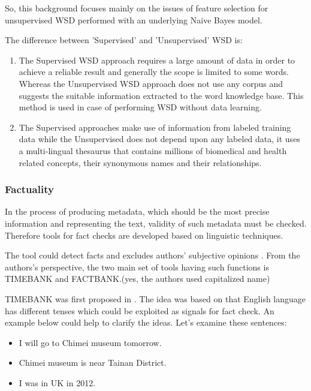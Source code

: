 So, this background focuses mainly on the issues of feature selection for unsupervised WSD performed with an underlying Naive Bayes model.

The difference between 'Supervised' and 'Unsupervised' WSD is:

\begin{enumerate}
	\item The Supervised WSD approach requires a large amount of data in order to achieve a reliable result and generally the scope is limited to some words. 
	Whereas the Unsupervised WSD approach does not use any corpus and suggests the suitable information extracted to the word knowledge base.
	This method is used in case of performing WSD without data learning.
	\item The Supervised approaches make use of information from labeled training data while the Unsupervised does not depend upon any labeled data, it uses a multi-lingual thesaurus that contains millions of biomedical and health related concepts, their synonymous names and their relationships.
\end{enumerate}


\subsubsection*{Factuality}

In the process of producing metadata, which should be the most precise information and representing the text, validity of such metadata must be checked. 
Therefore tools for fact checks are developed based on linguistic techniques. 

The tool could detect facts and excludes authors' subjective opinions \cite{Agerri2014}. 
From the authors's perspective, the two main set of tools having such functions is TIMEBANK and FACTBANK.(yes, the authors used capitalized name)

TIMEBANK was first proposed in \cite{pustejovsky2003timebank}. 
The idea was based on that English language has different tenses which could be exploited as signals for fact check. 
An example below could help to clarify the ideas.
 Let's examine these sentences:

\begin{itemize}
	\item I will go to Chimei museum tomorrow.
	\item Chimei museum is near Tainan District.
	\item I was in UK in 2012.
\end{itemize}

